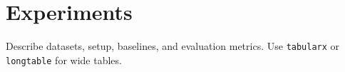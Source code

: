 ﻿\section{Experiments}

Describe datasets, setup, baselines, and evaluation metrics.
Use \texttt{tabularx} or \texttt{longtable} for wide tables.
